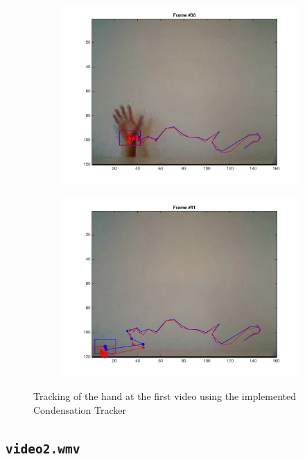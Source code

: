 \documentclass{ethz_report}
\begin{document}
\begin{figure}[h]
\begin{subfigure}[b]{.25\textwidth}
    \end{subfigure}%
    \begin{subfigure}[b]{.25\textwidth}
        \centering
        \includegraphics[width=1\linewidth]{images/video1_26}
    \end{subfigure}%
    \begin{subfigure}[b]{.25\textwidth}
        \centering
        \includegraphics[width=1\linewidth]{images/video1_31}
    \end{subfigure}
    \caption{Tracking of the hand at the first video using the implemented Condensation Tracker}
    \label{fig:tracking_video1}
\end{figure}

\subsection*{\texttt{video2.wmv}}
\end{document}
